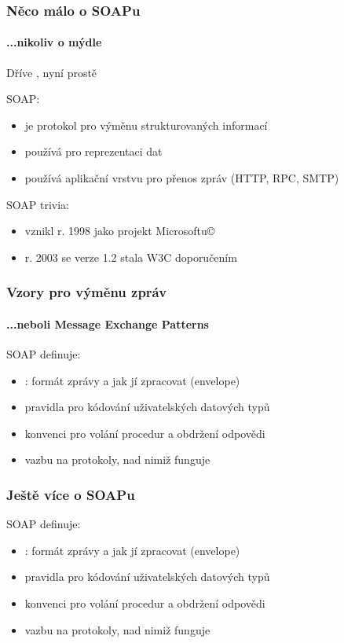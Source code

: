 \documentclass[12pt]{beamer}
\begin{document}
\begin{frame}
  \frametitle{Něco málo o SOAPu}
  \framesubtitle{...nikoliv o mýdle}

  Dříve , nyní prostě 

  \begin{block}{SOAP:}
    \begin{itemize}
      \item je protokol pro výměnu strukturovaných informací
      \item používá  pro reprezentaci dat
      \item používá aplikační vrstvu pro přenos zpráv (HTTP, RPC, SMTP)
    \end{itemize}
  \end{block}

  \begin{block}{SOAP trivia:}
    \begin{itemize}
      \item vznikl r. 1998 jako projekt Microsoftu\copyright
      \item r. 2003 se verze 1.2 stala W3C doporučením
    \end{itemize}
  \end{block}
\end{frame}

\begin{frame}
  \frametitle{Vzory pro výměnu zpráv}
  \framesubtitle{...neboli Message Exchange Patterns}

  \begin{block}{SOAP definuje:}
    \begin{itemize}
      \item {}: formát zprávy a jak jí zpracovat (envelope)
      \item pravidla pro kódování uživatelských datových typů
      \item konvenci pro volání procedur a obdržení odpovědi
      \item vazbu na protokoly, nad nimiž funguje
    \end{itemize}
  \end{block}
\end{frame}

\begin{frame}
  \frametitle{Ještě více o SOAPu}

  \begin{block}{SOAP definuje:}
    \begin{itemize}
      \item {}: formát zprávy a jak jí zpracovat (envelope)
      \item pravidla pro kódování uživatelských datových typů
      \item konvenci pro volání procedur a obdržení odpovědi
      \item vazbu na protokoly, nad nimiž funguje
    \end{itemize}
  \end{block}
\end{frame}
\end{document}
